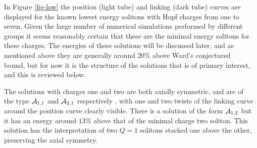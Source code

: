 \documentclass[12pt]{article}
\begin{document}
In Figure \ref{fig-low} the position (light tube) and linking (dark tube)
curves are displayed for the known lowest energy solitons with Hopf
charges from one to seven. Given the large number of numerical
simulations performed by different groups it seems reasonably
certain that these are the minimal energy solitons for these
charges. The energies of these solutions will be discussed later,
and as mentioned above they are generally around $20\%$ above Ward's
conjectured bound, but for now it is the structure of the solutions
that is of primary interest, and this is reviewed below.

The solutions with charges one and two are both axially symmetric,
and are of the type ${\cal A}_{1,1}$ and ${\cal A}_{2,1}$
respectively \cite{FN,GH}, with one and two twists of the linking
curve around the position curve clearly visible. There is a solution
of the form ${\cal A}_{1,2}$ \cite{Wa4,Wa5,HS} but it has an energy
around $13\%$ above that of the minimal charge two soliton. This
solution has the interpretation of two $Q=1$ solitons stacked one
above the other, preserving the axial symmetry.
\end{document}
